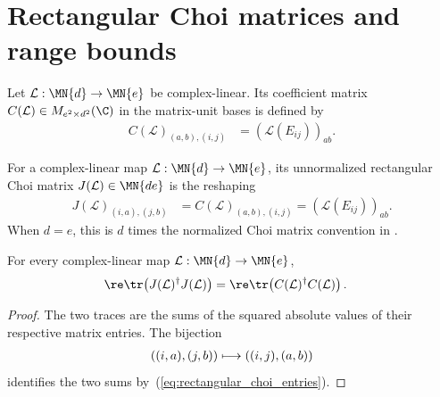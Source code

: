\section{Rectangular Choi matrices and range bounds}

\begin{definition}
    \label{def:linear_map_matrix}
    \leanok
    Let $\mathcal L:\MN{d}\to\MN{e}$ be complex-linear. Its coefficient
    matrix $C(\mathcal L)\in M_{e^2\times d^2}(\C)$ in the matrix-unit bases is
    defined by
    \begin{align}
        C(\mathcal L)_{(a,b),(i,j)}
         & =(\mathcal L(E_{ij}))_{ab}.
        \label{eq:rectangular_choi_coefficient_matrix}
    \end{align}
\end{definition}

\begin{definition}
    \label{def:rectangular_choi}
    \leanok
    For a complex-linear map $\mathcal L:\MN{d}\to\MN{e}$, its unnormalized
    rectangular Choi matrix $J(\mathcal L)\in\MN{de}$ is the reshaping
    \begin{align}
        J(\mathcal L)_{(i,a),(j,b)}
         & =C(\mathcal L)_{(a,b),(i,j)}
        =(\mathcal L(E_{ij}))_{ab}.
        \label{eq:rectangular_choi_entries}
    \end{align}
    When $d=e$, this is $d$ times the normalized Choi matrix convention in
    \cite[Proposition~2.1]{Wolf2012Quantum}.
\end{definition}

\begin{theorem}
    \label{thm:rectangular_choi_parseval}
    \leanok
    For every complex-linear map $\mathcal L:\MN{d}\to\MN{e}$,
    \begin{align}
        \re\tr\!\left(J(\mathcal L)^\dagger J(\mathcal L)\right)
         & =
        \re\tr\!\left(C(\mathcal L)^\dagger C(\mathcal L)\right).
        \label{eq:rectangular_choi_parseval}
    \end{align}
\end{theorem}

\begin{proof}\leanok
    The two traces are the sums of the squared absolute values of their
    respective matrix entries. The bijection
    \begin{align}
        ((i,a),(j,b))\longmapsto((i,j),(a,b))
        \notag
    \end{align}
    identifies the two sums by~(\ref{eq:rectangular_choi_entries}).
\end{proof}

